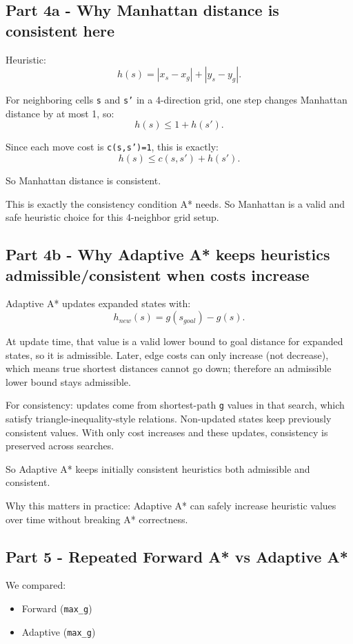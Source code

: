 \documentclass[11pt]{article}
\begin{document}
\subsection*{Part 4a - Why Manhattan distance is consistent here}

Heuristic:
\[
h(s)=|x_s-x_g|+|y_s-y_g|.
\]

For neighboring cells \texttt{s} and \texttt{s'} in a 4-direction grid, one step changes Manhattan distance by at most 1, so:
\[
h(s)\le 1+h(s').
\]

Since each move cost is \texttt{c(s,s')=1}, this is exactly:
\[
h(s)\le c(s,s')+h(s').
\]

So Manhattan distance is consistent.

This is exactly the consistency condition A* needs. So Manhattan is a valid and safe heuristic choice for this 4-neighbor grid setup.

\subsection*{Part 4b - Why Adaptive A* keeps heuristics admissible/consistent when costs increase}

Adaptive A* updates expanded states with:
\[
h_{new}(s)=g(s_{goal})-g(s).
\]

At update time, that value is a valid lower bound to goal distance for expanded states, so it is admissible.  
Later, edge costs can only increase (not decrease), which means true shortest distances cannot go down; therefore an admissible lower bound stays admissible.

For consistency: updates come from shortest-path \texttt{g} values in that search, which satisfy triangle-inequality-style relations. Non-updated states keep previously consistent values. With only cost increases and these updates, consistency is preserved across searches.

So Adaptive A* keeps initially consistent heuristics both admissible and consistent.

Why this matters in practice: Adaptive A* can safely increase heuristic values over time without breaking A* correctness.

\subsection*{Part 5 - Repeated Forward A* vs Adaptive A*}

We compared:

\begin{itemize}[leftmargin=*]
\item Forward (\texttt{max\_g})
\item Adaptive (\texttt{max\_g})
\end{itemize}
\end{document}
